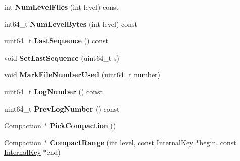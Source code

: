 \begin{DoxyCompactItemize}
\item 
\mbox{\label{classleveldb_1_1_version_set_ac23afa1a53cf1f3b18319312b7681ee6}} 
int {\bfseries Num\+Level\+Files} (int level) const
\item 
\mbox{\label{classleveldb_1_1_version_set_a02d41742ab464b83e06c7ab347db2126}} 
int64\+\_\+t {\bfseries Num\+Level\+Bytes} (int level) const
\item 
\mbox{\label{classleveldb_1_1_version_set_a265fa1089536e2b66cc3cc52a2a5bc1e}} 
uint64\+\_\+t {\bfseries Last\+Sequence} () const
\item 
\mbox{\label{classleveldb_1_1_version_set_a2234860e72a1ac7361d7bee107da6a07}} 
void {\bfseries Set\+Last\+Sequence} (uint64\+\_\+t s)
\item 
\mbox{\label{classleveldb_1_1_version_set_a8a009a58938b12c7a69bda2b4da115a0}} 
void {\bfseries Mark\+File\+Number\+Used} (uint64\+\_\+t number)
\item 
\mbox{\label{classleveldb_1_1_version_set_a78960eb465191babdd19ed75bc3ea91b}} 
uint64\+\_\+t {\bfseries Log\+Number} () const
\item 
\mbox{\label{classleveldb_1_1_version_set_aa0130ef9785e68ccc85506a79cb433be}} 
uint64\+\_\+t {\bfseries Prev\+Log\+Number} () const
\item 
\mbox{\label{classleveldb_1_1_version_set_a1cdc6a05e0a7df9f29b5bccd485a0219}} 
\mbox{\hyperlink{classleveldb_1_1_compaction}{Compaction}} $\ast$ {\bfseries Pick\+Compaction} ()
\item 
\mbox{\label{classleveldb_1_1_version_set_a3a03f9a6c86e861be314cf8e01f33142}} 
\mbox{\hyperlink{classleveldb_1_1_compaction}{Compaction}} $\ast$ {\bfseries Compact\+Range} (int level, const \mbox{\hyperlink{classleveldb_1_1_internal_key}{Internal\+Key}} $\ast$begin, const \mbox{\hyperlink{classleveldb_1_1_internal_key}{Internal\+Key}} $\ast$end)
\item 

\end{DoxyCompactItemize}
